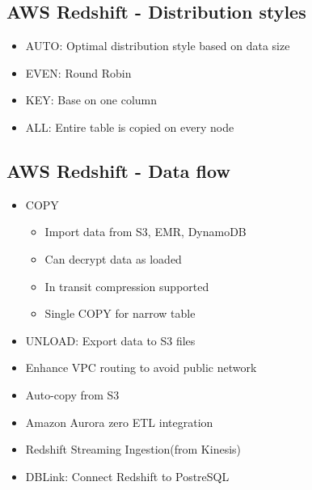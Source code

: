 \documentclass[../main.tex]{subfiles}
\begin{document}
\subsection{AWS Redshift - Distribution styles}
\begin{itemize}
    \item AUTO: Optimal distribution style based on data size
    \item EVEN: Round Robin
    \item KEY: Base on one column
    \item ALL: Entire table is copied on every node
\end{itemize}

\subsection{AWS Redshift - Data flow}
\begin{itemize}
    \item COPY
    \begin{itemize}
        \item Import data from S3, EMR, DynamoDB
        \item Can decrypt data as loaded
        \item In transit compression supported
        \item Single COPY for narrow table
    \end{itemize}
    \item UNLOAD: Export data to S3 files
    \item Enhance VPC routing to avoid public network
    \item Auto-copy from S3
    \item Amazon Aurora zero ETL integration
    \item Redshift Streaming Ingestion(from Kinesis)
    \item DBLink: Connect Redshift to PostreSQL
\end{itemize}
\end{document}
